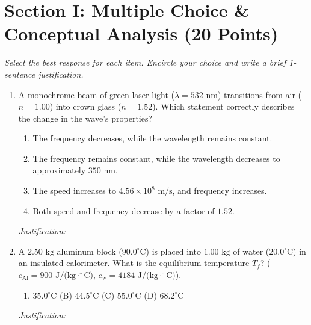 \documentclass[11pt,a4paper]{article}
\begin{document}
\vspace{0.08cm}

\section{Section I: Multiple Choice \& Conceptual Analysis (20 Points)}
\textit{Select the best response for each item. Encircle your choice and write a brief 1-sentence justification.}

\vspace{0.08cm}

\begin{enumerate}[label=\textbf{Q\arabic*.}, leftmargin=1.5em, itemsep=0.15em]

  \item A monochrome beam of green laser light ($\lambda = 532\text{ nm}$) transitions from air ($n = 1.00$) into crown glass ($n = 1.52$). Which statement correctly describes the change in the wave's properties?
  \begin{enumerate}[label=(\Alph*), leftmargin=1.8em, itemsep=0pt]
    \item The frequency decreases, while the wavelength remains constant.
    \item The frequency remains constant, while the wavelength decreases to approximately $350\text{ nm}$.
    \item The speed increases to $4.56 \times 10^8\text{ m/s}$, and frequency increases.
    \item Both speed and frequency decrease by a factor of $1.52$.
  \end{enumerate}
  \textit{Justification:} \underline{\hspace{12.5cm}}

  \item A $2.50\text{ kg}$ aluminum block ($90.0^\circ\text{C}$) is placed into $1.00\text{ kg}$ of water ($20.0^\circ\text{C}$) in an insulated calorimeter. What is the equilibrium temperature $T_f$? ($c_{\text{Al}} = 900\text{ J/(kg}\cdot^\circ\text{C)}$, $c_{\text{w}} = 4184\text{ J/(kg}\cdot^\circ\text{C)}$).
  \begin{enumerate}[label=(\Alph*), leftmargin=1.8em, itemsep=0pt]
    \item $35.0^\circ\text{C}$ \quad (B) $44.5^\circ\text{C}$ \quad (C) $55.0^\circ\text{C}$ \quad (D) $68.2^\circ\text{C}$
  \end{enumerate}
  \textit{Justification:} \underline{\hspace{12.5cm}}


\end{enumerate}
\end{document}
